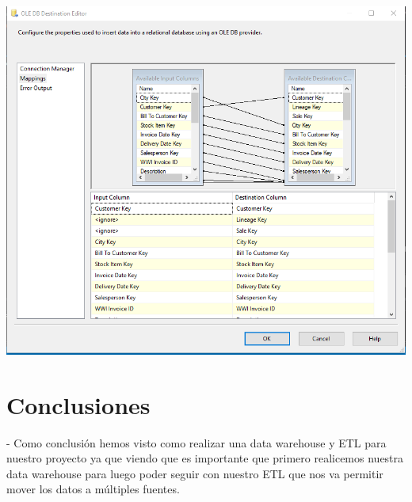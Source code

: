 \documentclass[12pt,letterpaper]{article}
\begin{document}
\begin{center}
\includegraphics[width=17cm]{IMG/40.png} 
\end{center}
\section{Conclusiones} 

-	Como conclusi\'on hemos visto como realizar una data warehouse y ETL para nuestro proyecto ya que viendo que es importante que primero realicemos nuestra data warehouse para luego poder seguir con nuestro ETL que nos va permitir mover los datos a m\'ultiples fuentes.
\end{document}
